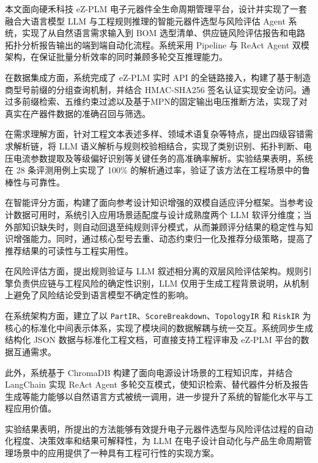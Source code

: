 本文面向硬禾科技 eZ-PLM 电子元器件全生命周期管理平台，设计并实现了一套融合大语言模型 LLM 与工程规则推理的智能元器件选型与风险评估 Agent 系统，实现了从自然语言需求输入到 BOM 选型清单、供应链风险评估报告和电路拓扑分析报告输出的端到端自动化流程。系统采用 Pipeline 与 ReAct Agent 双模架构，在保证批量分析效率的同时兼顾多轮交互推理能力。

在数据集成方面，系统完成了 eZ-PLM 实时 API 的全链路接入，构建了基于制造商型号前缀的分组查询机制，并结合 HMAC-SHA256 签名认证实现安全访问。通过多前缀检索、五维约束过滤以及基于MPN的固定输出电压推断方法，实现了对真实在产器件数据的准确召回与筛选。

在需求理解方面，针对工程文本表述多样、领域术语复杂等特点，提出四级容错需求解析链，将 LLM 语义解析与规则校验相结合，实现了类别识别、拓扑判断、电压电流参数提取及等级偏好识别等关键任务的高准确率解析。实验结果表明，系统在 28 条评测用例上实现了 100\% 的解析通过率，验证了该方法在工程场景中的鲁棒性与可靠性。

在智能评分方面，构建了面向参考设计知识增强的双模自适应评分框架。当参考设计数据可用时，系统引入应用场景适配度与设计成熟度两个 LLM 软评分维度；当外部知识缺失时，则自动回退至纯规则评分模式，从而兼顾评分结果的稳定性与知识增强能力。同时，通过核心型号去重、动态约束归一化及推荐分级策略，提高了推荐结果的可读性与工程实用性。

在风险评估方面，提出规则验证与 LLM 叙述相分离的双层风险评估架构。规则引擎负责供应链与工程风险的确定性识别，LLM 仅用于生成工程背景说明，从机制上避免了风险结论受到语言模型不确定性的影响。

在系统架构方面，建立了以 \texttt{PartIR}、\texttt{ScoreBreakdown}、\texttt{TopologyIR} 和 \texttt{RiskIR} 为核心的标准化中间表示体系，实现了模块间的数据解耦与统一交互。系统同步生成结构化 JSON 数据与标准化工程文档，可直接支持工程评审及 eZ-PLM 平台的数据互通需求。

此外，系统基于 ChromaDB 构建了面向电源设计场景的工程知识库，并结合 LangChain 实现 ReAct Agent 多轮交互模式，使知识检索、替代器件分析及报告生成等能力能够以自然语言方式被统一调用，进一步提升了系统的智能化水平与工程应用价值。

实验结果表明，所提出的方法能够有效提升电子元器件选型与风险评估过程的自动化程度、决策效率和结果可解释性，为 LLM 在电子设计自动化与产品生命周期管理场景中的应用提供了一种具有工程可行性的实现方案。

